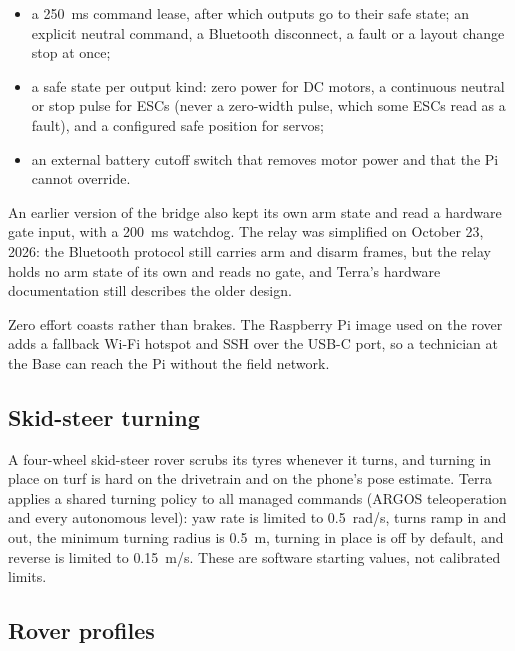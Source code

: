 \begin{itemize}
\item a 250~ms command lease, after which outputs go to their safe state; an explicit neutral command, a Bluetooth disconnect, a fault or a layout change stop at once;
\item a safe state per output kind: zero power for DC motors, a continuous neutral or stop pulse for ESCs (never a zero-width pulse, which some ESCs read as a fault), and a configured safe position for servos;
\item an external battery cutoff switch that removes motor power and that the Pi cannot override.
\end{itemize}

An earlier version of the bridge also kept its own arm state and read a hardware gate input, with a 200~ms watchdog.
The relay was simplified on October 23, 2026: the Bluetooth protocol still carries arm and disarm frames, but the relay holds no arm state of its own and reads no gate, and Terra's hardware documentation still describes the older design.

Zero effort coasts rather than brakes.
The Raspberry Pi image used on the rover adds a fallback Wi-Fi hotspot and SSH over the USB-C port, so a technician at the Base can reach the Pi without the field network.

\subsection{Skid-steer turning}

A four-wheel skid-steer rover scrubs its tyres whenever it turns, and turning in place on turf is hard on the drivetrain and on the phone's pose estimate.
Terra applies a shared turning policy to all managed commands (ARGOS teleoperation and every autonomous level): yaw rate is limited to 0.5~rad/s, turns ramp in and out, the minimum turning radius is 0.5~m, turning in place is off by default, and reverse is limited to 0.15~m/s.
These are software starting values, not calibrated limits.

\subsection{Rover profiles}
\label{sec:rover-profiles}


